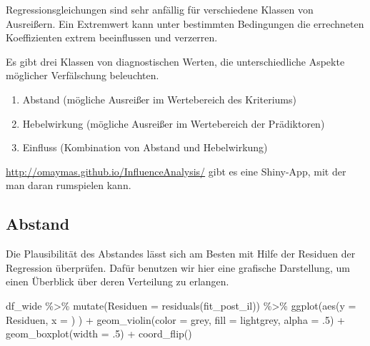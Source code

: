 \documentclass[
]{book}
\newenvironment{Shaded}{\begin{snugshade}}{\end{snugshade}}
\newcommand{\AttributeTok}[1]{\textcolor[rgb]{0.77,0.63,0.00}{#1}}
\newcommand{\DecValTok}[1]{\textcolor[rgb]{0.00,0.00,0.81}{#1}}
\newcommand{\FunctionTok}[1]{\textcolor[rgb]{0.00,0.00,0.00}{#1}}
\newcommand{\NormalTok}[1]{#1}
\newcommand{\SpecialCharTok}[1]{\textcolor[rgb]{0.00,0.00,0.00}{#1}}
\newcommand{\StringTok}[1]{\textcolor[rgb]{0.31,0.60,0.02}{#1}}
\begin{document}
Regressionsgleichungen sind sehr anfällig für verschiedene Klassen von Ausreißern.
Ein Extremwert kann unter bestimmten Bedingungen die errechneten Koeffizienten extrem beeinflussen und verzerren.

Es gibt drei Klassen von diagnostischen Werten, die unterschiedliche Aspekte möglicher Verfälschung beleuchten.

\begin{enumerate}
\def\labelenumi{\arabic{enumi}.}
\item
  Abstand (mögliche Ausreißer im Wertebereich des Kriteriums)
\item
  Hebelwirkung (mögliche Ausreißer im Wertebereich der Prädiktoren)
\item
  Einfluss (Kombination von Abstand und Hebelwirkung)
\end{enumerate}

\href{Hier}{http://omaymas.github.io/InfluenceAnalysis/} gibt es eine Shiny-App, mit der man daran rumspielen kann.

\hypertarget{abstand}{%
\subsection{Abstand}\label{abstand}}

Die Plausibilität des Abstandes lässt sich am Besten mit Hilfe der Residuen der Regression überprüfen.
Dafür benutzen wir hier eine grafische Darstellung, um einen Überblick über deren Verteilung zu erlangen.

\begin{Shaded}
\begin{Highlighting}[]
\NormalTok{df\_wide }\SpecialCharTok{\%\textgreater{}\%} 
  \FunctionTok{mutate}\NormalTok{(}\AttributeTok{Residuen =} \FunctionTok{residuals}\NormalTok{(fit\_post\_il)) }\SpecialCharTok{\%\textgreater{}\%} 
\FunctionTok{ggplot}\NormalTok{(}\FunctionTok{aes}\NormalTok{(}\AttributeTok{y =}\NormalTok{ Residuen, }\AttributeTok{x =} \StringTok{\textquotesingle{}\textquotesingle{}}\NormalTok{) ) }\SpecialCharTok{+}
  \FunctionTok{geom\_violin}\NormalTok{(}\AttributeTok{color =} \StringTok{\textquotesingle{}grey\textquotesingle{}}\NormalTok{, }\AttributeTok{fill =} \StringTok{\textquotesingle{}lightgrey\textquotesingle{}}\NormalTok{,}
              \AttributeTok{alpha =}\NormalTok{ .}\DecValTok{5}\NormalTok{) }\SpecialCharTok{+}
  \FunctionTok{geom\_boxplot}\NormalTok{(}\AttributeTok{width =}\NormalTok{ .}\DecValTok{5}\NormalTok{) }\SpecialCharTok{+}
  \FunctionTok{coord\_flip}\NormalTok{()}
\end{Highlighting}
\end{Shaded}
\end{document}

